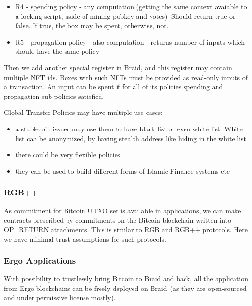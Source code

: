 \documentclass{llncs}   %
\newcommand{\bc}{Braid}
\begin{document}
\begin{itemize} 
 \item R4 - spending policy - any computation (getting the same context avaiable to a locking script, aside of mining pubkey and votes). Should return true or false. If true, the box may be spent, otherwise, not. 
 \item R5 - propagation policy - also computation - returns number of inputs which should have the same policy
\end{itemize}

Then we add another special register in Braid, and this register may contain multiple NFT ids. Boxes with such NFTs must be provided as read-only inputs of a transaction. An input can be spent if for all of its policies spending and propagation sub-policies satisfied.



Global Transfer Policies may have multiple use cases:

\begin{itemize}
\item a stablecoin issuer may use them to have black list or even white list. White list can be anonymized, by having stealth address like hiding in the white list
\item there could be very flexible policies  
\item they can be used to build different forms of Islamic Finance systems etc
\end{itemize}

\subsubsection{RGB++}

As commitment for Bitcoin UTXO set is available in applications, we can make contracts prescribed by commitments on the Bitcoin blockchain  written into OP\_RETURN attachments. This is similar to RGB and RGB++ protocols. Here we have minimal trust assumptions for such protocols.

\subsubsection{Ergo Applications}

With possibility to trustlessly bring Bitcoin to \bc{} and back, all the application from Ergo blockchains can be freely deployed on \bc{}~(as they are open-sourced and under permissive license mostly).


\newpage

 
\end{document}
